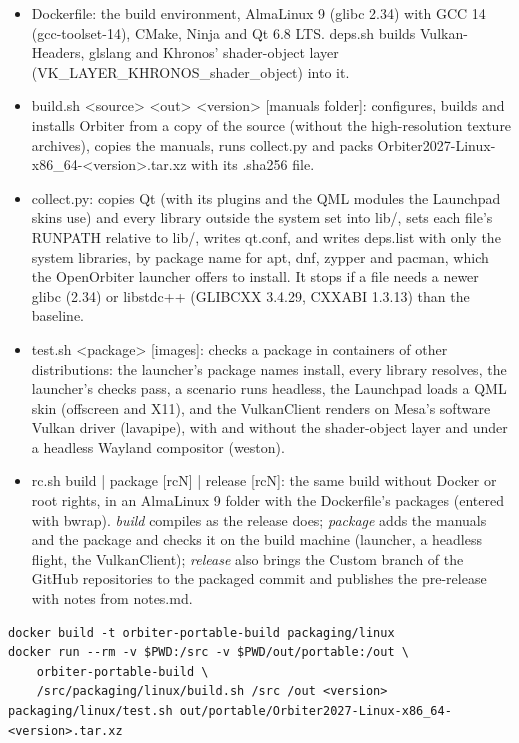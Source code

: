 \documentclass[Orbiter Developer Manual.tex]{subfiles}
\begin{document}
\begin{itemize}
\item Dockerfile: the build environment, AlmaLinux 9 (glibc 2.34) with GCC 14 (gcc-toolset-14), CMake, Ninja and Qt 6.8 LTS. deps.sh builds Vulkan-Headers, glslang and Khronos' shader-object layer (VK\_LAYER\_KHRONOS\_shader\_object) into it.
\item build.sh <source> <out> <version> [manuals folder]: configures, builds and installs Orbiter from a copy of the source (without the high-resolution texture archives), copies the manuals, runs collect.py and packs Orbiter2027-Linux-x86\_64-<version>.tar.xz with its .sha256 file.
\item collect.py: copies Qt (with its plugins and the QML modules the Launchpad skins use) and every library outside the system set into lib/, sets each file's RUNPATH relative to lib/, writes qt.conf, and writes deps.list with only the system libraries, by package name for apt, dnf, zypper and pacman, which the OpenOrbiter launcher offers to install. It stops if a file needs a newer glibc (2.34) or libstdc++ (GLIBCXX 3.4.29, CXXABI 1.3.13) than the baseline.
\item test.sh <package> [images]: checks a package in containers of other distributions: the launcher's package names install, every library resolves, the launcher's checks pass, a scenario runs headless, the Launchpad loads a QML skin (offscreen and X11), and the VulkanClient renders on Mesa's software Vulkan driver (lavapipe), with and without the shader-object layer and under a headless Wayland compositor (weston).
\item rc.sh build | package [rcN] | release [rcN]: the same build without Docker or root rights, in an AlmaLinux 9 folder with the Dockerfile's packages (entered with bwrap). \textit{build} compiles as the release does; \textit{package} adds the manuals and the package and checks it on the build machine (launcher, a headless flight, the VulkanClient); \textit{release} also brings the Custom branch of the GitHub repositories to the packaged commit and publishes the pre-release with notes from notes.md.
\end{itemize}

\begin{lstlisting}
docker build -t orbiter-portable-build packaging/linux
docker run --rm -v $PWD:/src -v $PWD/out/portable:/out \
    orbiter-portable-build \
    /src/packaging/linux/build.sh /src /out <version>
packaging/linux/test.sh out/portable/Orbiter2027-Linux-x86_64-<version>.tar.xz
\end{lstlisting}
\end{document}
